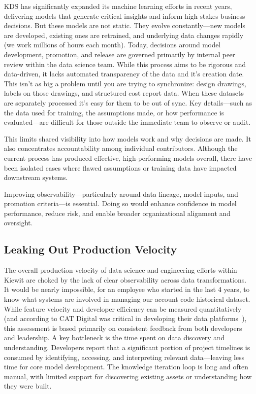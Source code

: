\documentclass{article}
\begin{document}
KDS has significantly expanded its machine learning efforts in recent years, delivering models that generate critical insights and inform high-stakes business decisions. But these models are not static. They evolve constantly—new models are developed, existing ones are retrained, and underlying data changes rapidly (we work millions of hours each month).
Today, decisions around model development, promotion, and release are governed primarily by internal peer review within the data science team. While this process aims to be rigorous and data-driven, it lacks automated transparency of the data and it's creation date.  This isn't as big a problem until you are trying to synchronize: design drawings, labels on those drawings, and structured cost report data.  When these datasets are separately processed it's easy for them to be out of sync. Key details—such as the data used for training, the assumptions made, or how performance is evaluated—are difficult for those outside the immediate team to observe or audit.

This limits shared visibility into how models work and why decisions are made. It also concentrates accountability among individual contributors. Although the current process has produced effective, high-performing models overall, there have been isolated cases where flawed assumptions or training data have impacted downstream systems.

Improving observability—particularly around data lineage, model inputs, and promotion criteria—is essential. Doing so would enhance confidence in model performance, reduce risk, and enable broader organizational alignment and oversight.

\subsection{Leaking Out Production Velocity}

The overall production velocity of data science and engineering efforts within Kiewit are choked by the lack of clear observability across data transformations.  It would be nearly impossible, for an employee who started in the last 4 years, to know what systems are involved in managing our account code historical dataset. While feature velocity and developer efficiency can be measured quantitatively (and according to CAT Digital was critical in developing their data platforms~\cite{helios2025}), this assessment is based primarily on consistent feedback from both developers and leadership.
A key bottleneck is the time spent on data discovery and understanding. Developers report that a significant portion of project timelines is consumed by identifying, accessing, and interpreting relevant data—leaving less time for core model development. The knowledge iteration loop is long and often manual, with limited support for discovering existing assets or understanding how they were built.
\end{document}
